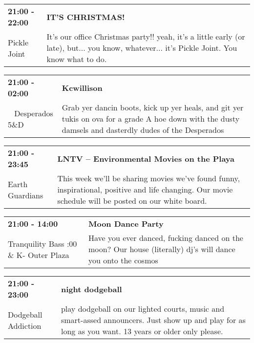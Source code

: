 \begin{tabular}{ p{1in} p{2.2in} }
    \textbf{21:00 - 22:00} & \textbf{IT'S CHRISTMAS!} \\
    Pickle Joint \newline  & It's our office Christmas party!!  yeah, it's a little early (or late), but... you know, whatever... it's Pickle Joint. You know what to do. \\
    \hline 
\end{tabular}
    
\begin{tabular}{ p{1in} p{2.2in} }
    \textbf{21:00 - 02:00} & \textbf{Kcwillison} \\
    ~ \newline Desperados 5\&D & Grab yer dancin boots, kick up yer heals, and git yer tukis on ova for a grade A hoe down with the dusty damsels and dasterdly dudes of the Desperados \\
    \hline 
\end{tabular}
    
\begin{tabular}{ p{1in} p{2.2in} }
    \textbf{21:00 - 23:45} & \textbf{LNTV -- Environmental Movies on the Playa } \\
    Earth Guardians \newline  & This week we'll be sharing movies we've found funny, inspirational, positive and life changing. Our movie schedule will be posted on our white board. \\
    \hline 
\end{tabular}
    
\begin{tabular}{ p{1in} p{2.2in} }
    \textbf{21:00 - 14:00} & \textbf{Moon Dance Party } \\
    Tranquility Bass \newline 9:00 \& K- Outer Plaza & Have you ever danced, fucking danced on the moon? Our house (literally) dj's will dance you onto the cosmos \\
    \hline 
\end{tabular}
    
\begin{tabular}{ p{1in} p{2.2in} }
    \textbf{21:00 - 23:00} & \textbf{night dodgeball} \\
    Dodgeball Addiction \newline  & play dodgeball on our lighted courts, music and smart-assed announcers. Just show up and play for as long as you want. 13 years or older only please. \\
    \hline 
\end{tabular}
    
